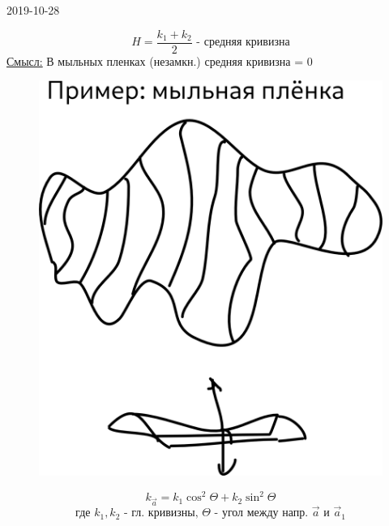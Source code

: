 \documentclass[12pt, fleqn]{article}
\begin{document}
\begin{lect}{2019-10-28}
    \begin{Definition}
        \[H = \frac{k_1 + k_2}{2} \text{ - средняя кривизна}\]
        \ul{Смысл:} В мыльных пленках (незамкн.) средняя кривизна = 0
        \begin{figure}[H]
            \includegraphics[scale=1]{pics/8_5.png}
            \centering
        \end{figure}

    \end{Definition}

    \begin{Theorem}[Эйлера]
        \[k_{\vec{a}} = k_1 \cos^2 \Theta + k_2 \sin^2\Theta \]
        \[\text{где } k_1, k_2 \text{ - гл. кривизны, } \Theta \text{ - угол между
        напр. } \vec{a} \text{ и } \vec{a}_1\]
    \end{Theorem}


\end{lect}
\end{document}
